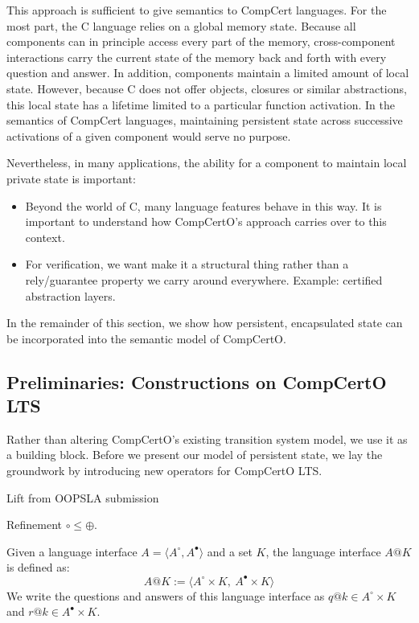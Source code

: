 \documentclass[acmsmall,screen,review,anonymous]{acmart}
\newcommand{\que}{\circ}
\newcommand{\ans}{\bullet}
\begin{document}
This approach is sufficient to give semantics to CompCert languages.
For the most part, the C language relies on a global memory state.
Because all components can in principle access every part of the memory,
cross-component interactions carry the current state of the memory
back and forth with every question and answer.
In addition,
components maintain a limited amount of local state.
However,
because C does not offer objects, closures or similar abstractions,
this local state has a lifetime limited to a particular function activation.
In the semantics of CompCert languages,
maintaining persistent state across successive activations of a given component
would serve no purpose.

Nevertheless, in many applications,
the ability for a component to maintain local private state
is important:
\begin{itemize}
  \item Beyond the world of C,
    many language features behave in this way.
    It is important to understand how CompCertO's approach
    carries over to this context.
  \item For verification,
    we want make it a structural thing
    rather than a rely/guarantee property we carry around everywhere.
    Example: certified abstraction layers.
\end{itemize}
In the remainder of this section,
we show how persistent, encapsulated state
can be incorporated into
the semantic model of CompCertO.


\subsection{Preliminaries: Constructions on CompCertO LTS} %

Rather than altering CompCertO's existing transition system model,
we use it as a building block.
Before we present our model of persistent state,
we lay the groundwork by introducing new operators
for CompCertO LTS.

\begin{definition}
Lift from OOPSLA submission
\end{definition}

\begin{lemma}
Refinement ${\circ} \le {\oplus}$.
\end{lemma}

\begin{definition}
Given a language interface $A = \langle A^\que, A^\ans \rangle$
and a set $K$,
the language interface $A@K$ is defined as:
\[
  A@K := \langle A^\que \times K ,\: A^\ans \times K \rangle
\]
We write the questions and answers of this language interface as
$q@k \in A^\que \times K$ and
$r@k \in A^\ans \times K$.
\end{definition}
\end{document}
